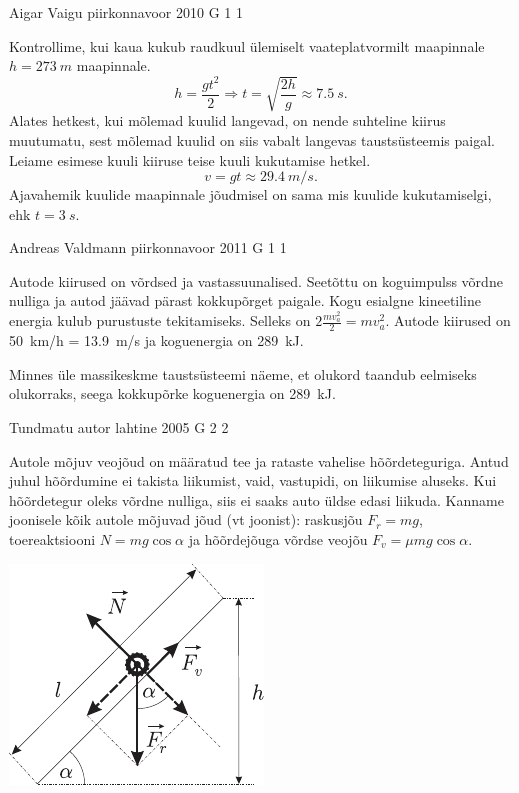 \documentclass[11pt, twoside]{article}
\begin{document}
{%
{Aigar Vaigu} %
{piirkonnavoor} %
{2010} %
{G 1} %
{1} %
{

\ifSolution
Kontrollime, kui kaua kukub raudkuul ülemiselt vaateplatvormilt maapinnale $h=\SI{273}{m}$ maapinnale.
\[h=\frac{gt^2}{2} \Rightarrow t=\sqrt{\frac{2h}{g}}\approx \SI{7.5}{s}.\]
Alates hetkest, kui mõlemad kuulid langevad, on nende suhteline kiirus muutumatu, sest mõlemad kuulid on siis vabalt langevas taustsüsteemis paigal.
Leiame esimese kuuli kiiruse teise kuuli kukutamise hetkel.
\[v=gt\approx \SI{29.4}{m/s}.\]
Ajavahemik kuulide maapinnale jõudmisel on sama mis kuulide kukutamiselgi, ehk $t=\SI{3}{s}$.
\fi
}

{Andreas Valdmann} %
{piirkonnavoor} %
{2011} %
{G 1} %
{1} %
{

\ifSolution
\osa Autode kiirused on võrdsed ja vastassuunalised. Seetõttu on koguimpulss võrdne nulliga ja autod jäävad pärast kokkupõrget paigale. Kogu esialgne kineetiline energia kulub purustuste tekitamiseks. Selleks on $2 \frac{m v_{a}^{2}}{2}=m v_{a}^{2}$. Autode kiirused on \SI{50}{km/h} = \SI{13,9}{m/s} ja koguenergia on \SI{289}{kJ}.

\osa Minnes üle massikeskme taustsüsteemi näeme, et olukord taandub eelmiseks olukorraks, seega kokkupõrke koguenergia on \SI{289}{kJ}.

\fi
}

{Tundmatu autor} %
{lahtine} %
{2005} %
{G 2} %
{2} %
{

\ifSolution
Autole mõjuv veojõud on määratud tee ja rataste vahelise hõõrdeteguriga. Antud juhul hõõrdumine ei takista liikumist, vaid, vastupidi, on liikumise aluseks. Kui hõõrdetegur oleks võrdne nulliga, siis ei saaks auto üldse edasi liikuda. Kanname joonisele kõik autole mõjuvad jõud (vt joonist): raskusjõu $F_r = mg$, toereaktsiooni $N = mg \cos \alpha$ ja hõõrdejõuga võrdse veojõu $F_v = \mu mg \cos \alpha$.

\begin{center}
	\includegraphics[width=0.5\linewidth]{2005-lahg-02-lah}
\end{center}

}}
\end{document}
